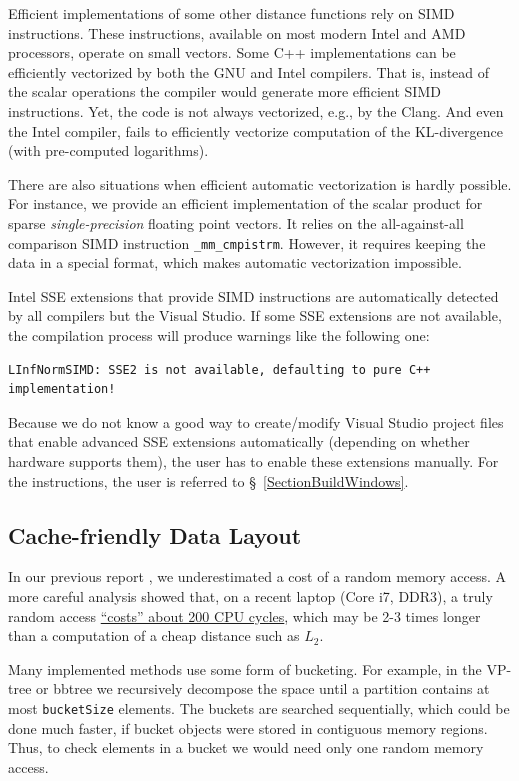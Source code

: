 \documentclass[runningheads,a4paper]{llncs}
\newcommand{\ttt}[1]{\texttt{#1}}
\begin{document}
Efficient implementations of some other distance functions 
rely on SIMD instructions. 
These instructions, available on most modern Intel and AMD processors, 
operate on small vectors. 
Some C++ implementations can be efficiently vectorized by both the GNU and Intel compilers.
That is, instead of the scalar operations the compiler would generate
more efficient SIMD instructions.
Yet, the code is not always vectorized, e.g., by the Clang.
And even the Intel compiler, fails to efficiently vectorize 
computation of the KL-divergence (with pre-computed logarithms).

There are also situations when efficient automatic vectorization
is hardly possible. For instance,
we provide an efficient implementation of the scalar product
for sparse \emph{single-precision} floating point vectors.
It relies on the all-against-all comparison SIMD instruction \texttt{\_mm\_cmpistrm}. 
However, it requires keeping the data in a special format,
which makes automatic vectorization impossible.

Intel SSE extensions that provide SIMD instructions are automatically detected
by all compilers but the Visual Studio.
If some SSE extensions are not available, the compilation process will produce warnings like the
following one:
{
\footnotesize
\begin{verbatim}
LInfNormSIMD: SSE2 is not available, defaulting to pure C++ implementation!
\end{verbatim}
}
Because we do not know a good way to create/modify Visual Studio project files 
that enable advanced SSE extensions automatically (depending on whether hardware supports them),
the user has to enable these extensions manually. 
For the instructions, the user is referred to \S~\ref{SectionBuildWindows}.

\subsection{Cache-friendly Data Layout}
In our previous report \cite{Boytsov_and_Bilegsaikhan:sisap2013},
we underestimated a cost of a random memory access.
A more careful analysis showed that, 
on a recent laptop (Core i7, DDR3), 
a truly random access \href{http://searchivarius.org/blog/main-memory-similar-hard-drive}{``costs'' about 200 CPU cycles},
which may be 2-3 times longer than a computation of a cheap distance such as $L_2$.

Many implemented methods use some form of bucketing.
For example, in the VP-tree or bbtree we recursively decompose the space
until a partition contains at most \ttt{bucketSize} elements.
The buckets are searched sequentially,
which could be done much faster, if bucket objects were stored
in contiguous memory regions.
Thus, to check elements in a bucket we would need only one random memory access.
\end{document}
